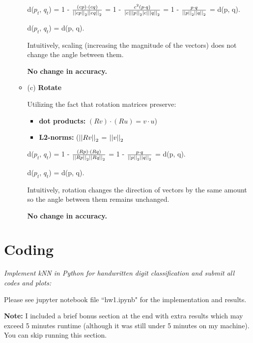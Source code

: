 \documentclass[fleqn]{article}
\begin{document}
\begin{enumerate}
\begin{itemize}
		            d($p_t$, $q_t$) = 1 - $\frac{(c p) \cdot (c q)}{\left\vert\left\vert c p \right\vert\right\vert_2 \left\vert\left\vert c q \right\vert\right\vert_2}$ = 1 - $\frac{c^2 (p \cdot q)}{|c| \left\vert\left\vert p \right\vert\right\vert_2 |c| \left\vert\left\vert q \right\vert\right\vert_2}$ = 1 - $\frac{p \cdot q}{\left\vert\left\vert p \right\vert\right\vert_2 \left\vert\left\vert q \right\vert\right\vert_2}$ = d(p, q).

		            d($p_t$, $q_t$) = d(p, q).

		            Intuitively, scaling (increasing the magnitude of the vectors) does not change the angle between them.

		            \textbf{No change in accuracy.}

		      \item (c) \textbf{Rotate}

		            Utilizing the fact that rotation matrices preserve:
		            \begin{itemize}
			            \item \textbf{dot products:} $(Rv) \cdot (Ru) = v \cdot u$)
			            \item \textbf{L2-norms:} ($\left\vert\left\vert Rv \right\vert\right\vert_2$ = $\left\vert\left\vert v \right\vert\right\vert_2$
		            \end{itemize}

		            d($p_t$, $q_t$) = 1 - $\frac{(R p) \cdot (R q)}{\left\vert\left\vert R p \right\vert\right\vert_2 \left\vert\left\vert R q \right\vert\right\vert_2}$ = 1 - $\frac{p \cdot q}{\left\vert\left\vert p \right\vert\right\vert_2 \left\vert\left\vert q \right\vert\right\vert_2}$ = d(p, q).

		            d($p_t$, $q_t$) = d(p, q).

		            Intuitively, rotation changes the direction of vectors by the same amount so the angle between them remains unchanged.

		            \textbf{No change in accuracy.}
	      \end{itemize}
\end{enumerate}

\section{Coding}

\textit{Implement kNN in Python for handwritten digit classification and submit all codes and plots:}

Please see jupyter notebook file ``hw1.ipynb" for the implementation and results.

\textbf{Note:} I included a brief bonus section at the end with extra results which may exceed 5 minutes runtime (although it was still under 5 minutes on my machine).
You can skip running this section.
\end{document}
